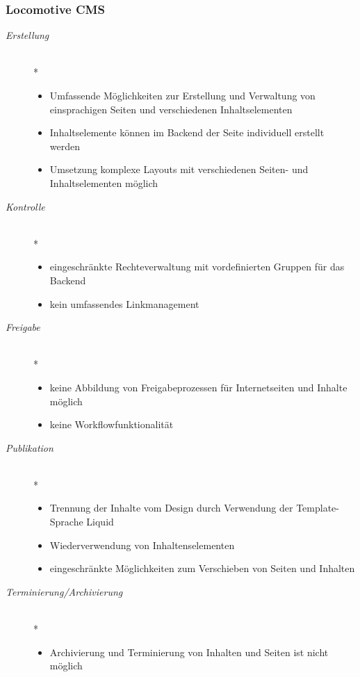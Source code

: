 \newpage
\subsubsection{Locomotive CMS}

\begin{description}
\item[\emph{Erstellung}]\mbox{~}\\*
\begin{itemize}
	\item Umfassende Möglichkeiten zur Erstellung und Verwaltung von einsprachigen Seiten und verschiedenen Inhaltselementen
	\item Inhaltselemente können im Backend der Seite individuell erstellt werden
	\item Umsetzung komplexe Layouts mit verschiedenen Seiten- und Inhaltselementen möglich
\end{itemize}
\item[\emph{Kontrolle}]\mbox{~}\\*
\begin{itemize}
	\item eingeschränkte Rechteverwaltung mit vordefinierten Gruppen für das Backend
	\item kein umfassendes Linkmanagement
\end{itemize}
\item[\emph{Freigabe}]\mbox{~}\\*
\begin{itemize}
	\item keine Abbildung von Freigabeprozessen für Internetseiten und Inhalte möglich
	\item keine Workflowfunktionalität
\end{itemize}
\item[\emph{Publikation}]\mbox{~}\\*
\begin{itemize}
	\item Trennung der Inhalte vom Design durch Verwendung der Template-Sprache Liquid
	\item Wiederverwendung von Inhaltenselementen
	\item eingeschränkte Möglichkeiten zum Verschieben von Seiten und Inhalten
\end{itemize}
\item[\emph{Terminierung/Archivierung}]\mbox{~}\\*
\begin{itemize}
	\item Archivierung und Terminierung von Inhalten und Seiten ist nicht möglich
\end{itemize}
\end{description}

